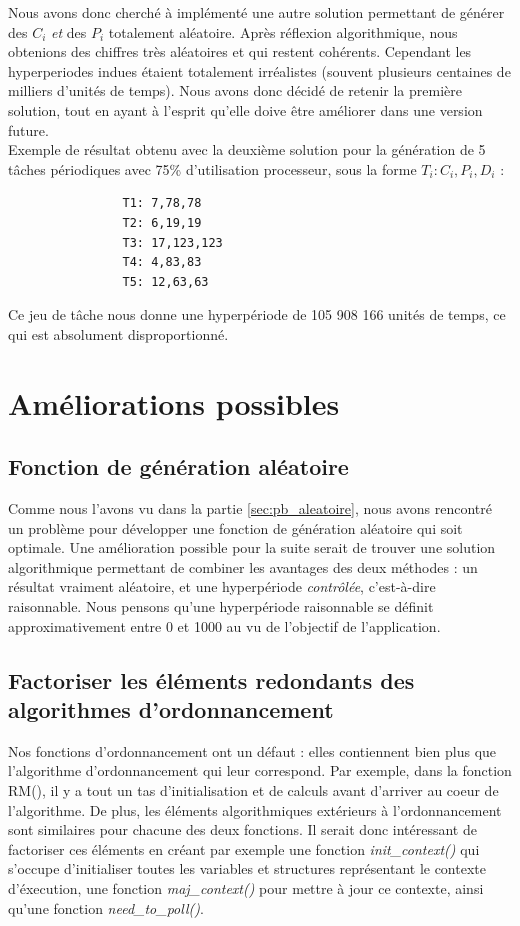 			Nous avons donc cherché à implémenté une autre solution permettant de générer des $C_i$ \emph{et} des $P_i$ totalement aléatoire. Après réflexion algorithmique, nous obtenions des chiffres très aléatoires et qui restent cohérents. Cependant les hyperperiodes indues étaient totalement irréalistes (souvent plusieurs centaines de milliers d'unités de temps). Nous avons donc décidé de retenir la première solution, tout en ayant à l'esprit qu'elle doive être améliorer dans une version future.\\
			
			Exemple de résultat obtenu avec la deuxième solution pour la génération de 5 tâches périodiques avec 75\% d'utilisation processeur, sous la forme $T_i: C_i,P_i,D_i$ :
			\begin{lstlisting}
				T1: 7,78,78
				T2: 6,19,19
				T3: 17,123,123
				T4: 4,83,83
				T5: 12,63,63
			\end{lstlisting}
			Ce jeu de tâche nous donne une hyperpériode de 105 908 166 unités de temps, ce qui est absolument disproportionné.
	
	\section{Améliorations possibles}
		\subsection{Fonction de génération aléatoire}
			Comme nous l'avons vu dans la partie \ref{sec:pb_aleatoire}, nous avons rencontré un problème pour développer une fonction de génération aléatoire qui soit optimale. Une amélioration possible pour la suite serait de trouver une solution algorithmique permettant de combiner les avantages des deux méthodes : un résultat vraiment aléatoire, et une hyperpériode \emph{contrôlée}, c'est-à-dire raisonnable. Nous pensons qu'une hyperpériode raisonnable se définit approximativement entre 0 et 1000 au vu de l'objectif de l'application.
			
		\subsection{Factoriser les éléments redondants des algorithmes d'ordonnancement}
			Nos fonctions d'ordonnancement ont un défaut : elles contiennent bien plus que l'algorithme d'ordonnancement qui leur correspond. Par exemple, dans la fonction RM(), il y a tout un tas d'initialisation et de calculs avant d'arriver au coeur de l'algorithme. De plus, les éléments algorithmiques extérieurs à l'ordonnancement sont similaires pour chacune des deux fonctions. Il serait donc intéressant de factoriser ces éléments en créant par exemple une fonction \emph{init\_context()} qui s'occupe d'initialiser toutes les variables et structures représentant le contexte d'éxecution, une fonction \emph{maj\_context()} pour mettre à jour ce contexte, ainsi qu'une fonction \emph{need\_to\_poll()}.\\
			
